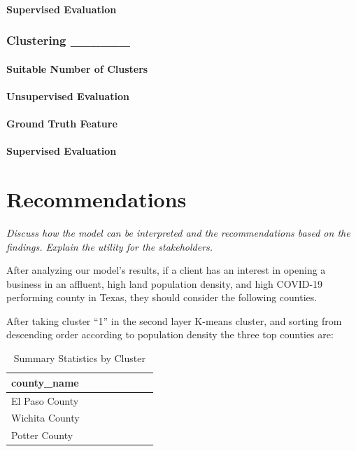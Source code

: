 \documentclass[
]{article}
\begin{document}
\paragraph{Supervised Evaluation}\label{supervised-evaluation-4}

\subsubsection{Clustering \_\_\_\_\_\_}\label{clustering-______}

\paragraph{Suitable Number of
Clusters}\label{suitable-number-of-clusters-5}

\paragraph{Unsupervised Evaluation}\label{unsupervised-evaluation-5}

\paragraph{Ground Truth Feature}\label{ground-truth-feature-5}

\paragraph{Supervised Evaluation}\label{supervised-evaluation-5}

\newpage

\section{Recommendations}\label{recommendations}

\emph{Discuss how the model can be interpreted and the recommendations
based on the findings. Explain the utility for the stakeholders.}

After analyzing our model's results, if a client has an interest in
opening a business in an affluent, high land population density, and
high COVID-19 performing county in Texas, they should consider the
following counties.

After taking cluster ``1'' in the second layer K-means cluster, and
sorting from descending order according to population density the three
top counties are:

\begin{table}[!h]
\centering
\caption{\label{tab:unnamed-chunk-24}Summary Statistics by Cluster}
\centering
\fontsize{7}{9}\selectfont
\begin{tabular}[t]{>{\raggedright\arraybackslash}p{1.25 cm}>{}p{1.25 cm}>{}p{1.25 cm}>{}p{1.25 cm}>{}p{1.25 cm}>{}p{1.25 cm}>{}p{1.25 cm}>{}p{1.25 cm}}
\toprule
county\_name\\
\midrule
El Paso County\\
Wichita County\\
Potter County\\
\bottomrule
\end{tabular}
\end{table}
\end{document}
